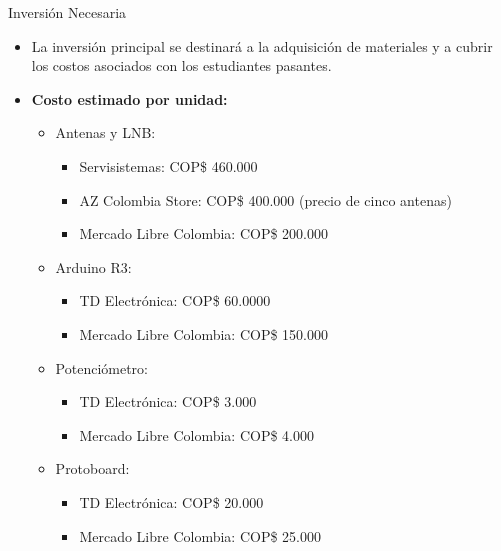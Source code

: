 \begin{frame}{Inversión Necesaria}
    \begin{itemize}
        \item La inversión principal se destinará a la adquisición de 
            materiales y a cubrir los costos asociados con los estudiantes 
            pasantes.
        \item \textbf{Costo estimado por unidad:}
        \begin{itemize}
            \item Antenas y LNB:
            \begin{itemize}
                \item Servisistemas: COP\$ 460.000
                \item AZ Colombia Store: COP\$ 400.000 (precio de cinco antenas)
                \item Mercado Libre Colombia: COP\$ 200.000
            \end{itemize}
            \item Arduino R3:
            \begin{itemize}
                \item TD Electrónica: COP\$ 60.0000
                \item Mercado Libre Colombia: COP\$ 150.000
            \end{itemize}
            \item Potenciómetro:
            \begin{itemize}
                \item TD Electrónica: COP\$ 3.000
                \item Mercado Libre Colombia: COP\$ 4.000
            \end{itemize}
            \item Protoboard:
            \begin{itemize}
                \item TD Electrónica: COP\$ 20.000
                \item Mercado Libre Colombia: COP\$ 25.000
            \end{itemize}
        \end{itemize}
    \end{itemize}
\end{frame}


